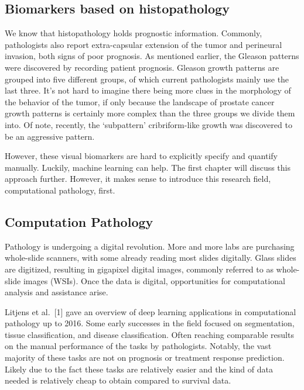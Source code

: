 \documentclass[
  12pt,
  a5,margin=2cmpaper,
]{article}
\begin{document}
\pagebreak

\hypertarget{biomarkers-based-on-histopathology}{%
\subsection{Biomarkers based on
histopathology}\label{biomarkers-based-on-histopathology}}

We know that histopathology holds prognostic information. Commonly,
pathologists also report extra-capsular extension of the tumor and
perineural invasion, both signs of poor prognosis. As mentioned earlier,
the Gleason patterns were discovered by recording patient prognosis.
Gleason growth patterns are grouped into five different groups, of which
current pathologists mainly use the last three. It's not hard to imagine
there being more clues in the morphology of the behavior of the tumor,
if only because the landscape of prostate cancer growth patterns is
certainly more complex than the three groups we divide them into. Of
note, recently, the `subpattern' cribriform-like growth was discovered
to be an aggressive pattern.

However, these visual biomarkers are hard to explicitly specify and
quantify manually. Luckily, machine learning can help. The first chapter
will discuss this approach further. However, it makes sense to introduce
this research field, computational pathology, first.

\hypertarget{computation-pathology}{%
\subsection{Computation Pathology}\label{computation-pathology}}

Pathology is undergoing a digital revolution. More and more labs are
purchasing whole-slide scanners, with some already reading most slides
digitally. Glass slides are digitized, resulting in gigapixel digital
images, commonly referred to as whole-slide images (WSIs). Once the data
is digital, opportunities for computational analysis and assistance
arise.

Litjens et al.~{[}1{]} gave an overview of deep learning applications in
computational pathology up to 2016. Some early successes in the field
focused on segmentation, tissue classification, and disease
classification. Often reaching comparable results on the manual
performance of the tasks by pathologists. Notably, the vast majority of
these tasks are not on prognosis or treatment response prediction.
Likely due to the fact these tasks are relatively easier and the kind of
data needed is relatively cheap to obtain compared to survival data.
\end{document}
